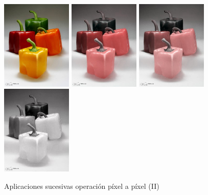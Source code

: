 \vskip0.3cm
\begin{figure}[H]
 \centering
 \includegraphics[width=0.3\textwidth]{imagenes/pimientos.jpg}
  \includegraphics[width=0.3\textwidth]{imagenes/pimientosMedia1.jpg}
  \vskip0.1cm
  \includegraphics[width=0.3\textwidth]{imagenes/pimientosMedia2.jpg}
  \includegraphics[width=0.3\textwidth]{imagenes/pimientosMedia3.jpg}
 \caption{Aplicaciones sucesivas operación píxel a píxel (II)}
 \label{diseño}
 \end{figure} 

